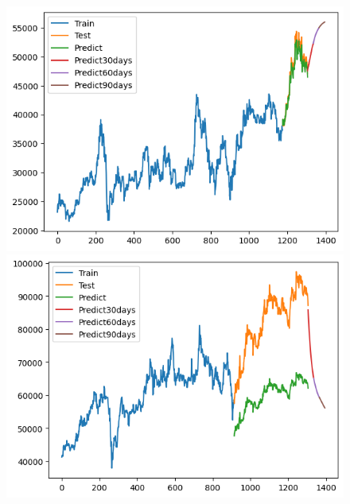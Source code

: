 \begin{figure}[H]
\begin{minipage}{0.15\textwidth}
    \centering
    \includegraphics[width=1\textwidth]{resources/chapter-5/newdata1/result/BIDV_ RNN_9-1.png}
    \end{minipage}
    \hfill
    \begin{minipage}{0.15\textwidth}
    \centering
    \includegraphics[width=1\textwidth]{resources/chapter-5/newdata1/result/VCB_ RNN_7-3.png}
    \end{minipage}
    \hfill
    \begin{minipage}{0.15\textwidth}
    \centering

\end{minipage}
\end{figure}
